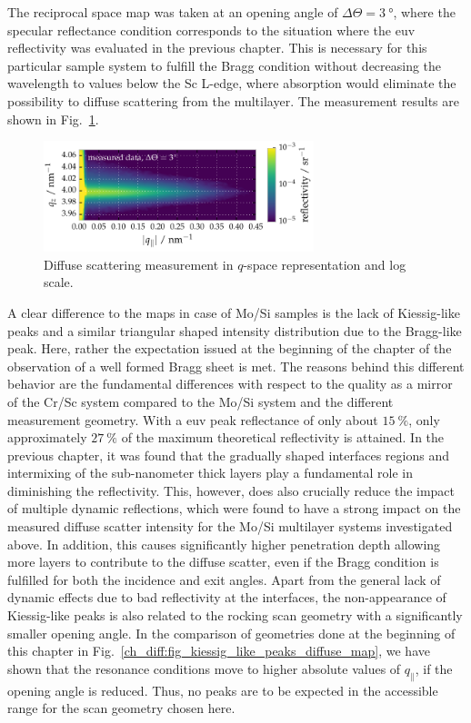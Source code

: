 The reciprocal space map was taken at an opening angle of $\Delta \Theta = \SI{3}{\degree}$, where the specular reflectance condition corresponds to the situation where the \gls{euv} reflectivity was evaluated in the previous chapter. This is necessary for this particular sample system to fulfill the Bragg condition without decreasing the wavelength to values below the Sc L-edge, where absorption would eliminate the possibility to diffuse scattering from the multilayer. The measurement results are shown in Fig.~\ref{ch_diff:fig_CrSc_diffuse_meas}.
\begin{figure}[htbp]
  \centering
  \includegraphics[width=0.7\textwidth]{img/CrSc_diffuse_measured}
  \caption{Diffuse scattering measurement in $q$-space representation and 
log scale.}
  \label{ch_diff:fig_CrSc_diffuse_meas}
\end{figure}
A clear difference to the maps in case of Mo/Si samples is the lack of Kiessig-like peaks and a similar triangular shaped intensity distribution due to the Bragg-like peak. Here, rather the expectation issued at the beginning of the chapter of the observation of a well formed Bragg sheet is met. The reasons behind this different behavior are the fundamental differences with respect to the quality as a mirror of the Cr/Sc system compared to the Mo/Si system and the different measurement geometry. With a \gls{euv} peak reflectance of only about $\SI{15}{\percent}$, only approximately $\SI{27}{\percent}$ of the maximum theoretical reflectivity is attained. In the previous chapter, it was found that the gradually shaped interfaces regions and intermixing of the sub-nanometer thick layers play a fundamental role in diminishing the reflectivity. This, however, does also crucially reduce the impact of multiple dynamic reflections, which were found to have a strong impact on the measured diffuse scatter intensity for the Mo/Si multilayer systems investigated above. In addition, this causes significantly higher penetration depth allowing more layers to contribute to the diffuse scatter, even if the Bragg condition is fulfilled for both the incidence and exit angles. Apart from the general lack of dynamic effects due to bad reflectivity at the interfaces, the non-appearance of Kiessig-like peaks is also related to the rocking scan geometry with a significantly smaller opening angle. In the comparison of geometries done at the beginning of this chapter in Fig.~\ref{ch_diff:fig_kiessig_like_peaks_diffuse_map}, we have shown that the resonance conditions move to higher absolute values of $q_\parallel$, if the opening angle is reduced. Thus, no peaks are to be expected in the accessible range for the scan geometry chosen here.

